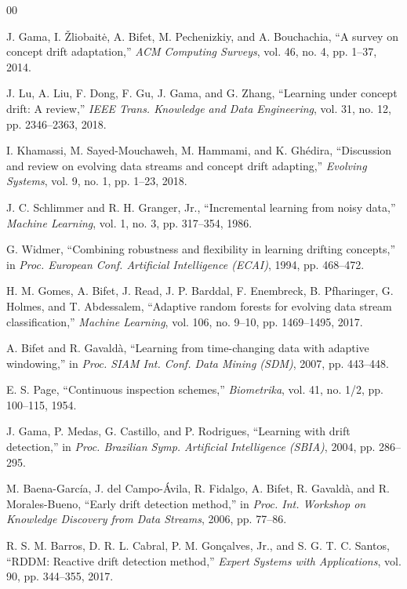 \documentclass[conference]{IEEEtran}
\begin{document}
\begin{thebibliography}{00}

J. Gama, I. \v{Z}liobait\.{e}, A. Bifet, M. Pechenizkiy, and A. Bouchachia, ``A
survey on concept drift adaptation,'' \emph{ACM Computing Surveys}, vol. 46, no. 4,
pp. 1--37, 2014.

J. Lu, A. Liu, F. Dong, F. Gu, J. Gama, and G. Zhang, ``Learning under concept
drift: A review,'' \emph{IEEE Trans. Knowledge and Data Engineering}, vol. 31,
no. 12, pp. 2346--2363, 2018.

I. Khamassi, M. Sayed-Mouchaweh, M. Hammami, and K. Gh\'edira, ``Discussion and
review on evolving data streams and concept drift adapting,'' \emph{Evolving
Systems}, vol. 9, no. 1, pp. 1--23, 2018.

J. C. Schlimmer and R. H. Granger, Jr., ``Incremental learning from noisy data,''
\emph{Machine Learning}, vol. 1, no. 3, pp. 317--354, 1986.

G. Widmer, ``Combining robustness and flexibility in learning drifting concepts,''
in \emph{Proc. European Conf. Artificial Intelligence (ECAI)}, 1994, pp. 468--472.

H. M. Gomes, A. Bifet, J. Read, J. P. Barddal, F. Enembreck, B. Pfharinger, G.
Holmes, and T. Abdessalem, ``Adaptive random forests for evolving data stream
classification,'' \emph{Machine Learning}, vol. 106, no. 9--10, pp. 1469--1495,
2017.

A. Bifet and R. Gavald\`a, ``Learning from time-changing data with adaptive
windowing,'' in \emph{Proc. SIAM Int. Conf. Data Mining (SDM)}, 2007, pp. 443--448.

E. S. Page, ``Continuous inspection schemes,'' \emph{Biometrika}, vol. 41, no.
1/2, pp. 100--115, 1954.

J. Gama, P. Medas, G. Castillo, and P. Rodrigues, ``Learning with drift
detection,'' in \emph{Proc. Brazilian Symp. Artificial Intelligence (SBIA)}, 2004,
pp. 286--295.

M. Baena-Garc\'ia, J. del Campo-\'Avila, R. Fidalgo, A. Bifet, R. Gavald\`a, and R.
Morales-Bueno, ``Early drift detection method,'' in \emph{Proc. Int. Workshop on
Knowledge Discovery from Data Streams}, 2006, pp. 77--86.

R. S. M. Barros, D. R. L. Cabral, P. M. Gon\c{c}alves, Jr., and S. G. T. C.
Santos, ``RDDM: Reactive drift detection method,'' \emph{Expert Systems with
Applications}, vol. 90, pp. 344--355, 2017.


\end{thebibliography}
\end{document}
